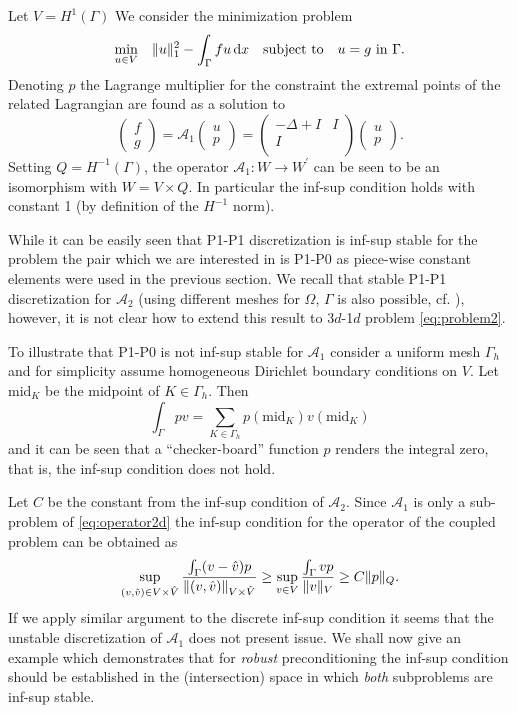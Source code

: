 Let $V=H^1{(\Gamma)}$ We consider the minimization problem
\[
\min_{u\in V}\quad\lVert{u}\rVert^2_1 - \int_{\Gamma}f u\,\mathrm{d}x\quad\mbox{subject to}\quad
u=g\mbox{ in }\Gamma.
\]
Denoting $p$ the Lagrange multiplier for the constraint the extremal points
of the related Lagrangian are found as a solution to
%
\begin{equation}\label{eq:A1}
\begin{pmatrix}f\\g\end{pmatrix}=
\mathcal{A}_1\begin{pmatrix}u\\p\end{pmatrix}=
%
\begin{pmatrix}
  -\Delta + I & I\\
  I           &  \\
\end{pmatrix}
\begin{pmatrix}u\\p\end{pmatrix}.
\end{equation}
%
Setting $Q=H^{-1}(\Gamma)$, the operator $\mathcal{A}_1:W\rightarrow W^{\prime}$
can be seen to be an isomorphism with $W=V\times Q$. In particular the inf-sup
condition holds with constant 1 (by definition of the $H^{-1}$ norm).

While it can be easily seen that P1-P1 discretization is inf-sup stable for
the problem the pair which we are interested in is P1-P0 as piece-wise constant
elements were used in the previous section. We recall that stable P1-P1 discretization
for $\mathcal{A}_2$ (using different meshes for $\Omega$, $\Gamma$ is also possible,
cf. \cite{burman2009interior}), however, it is not clear how to extend this result
to 3$d$-1$d$ problem \eqref{eq:problem2}.

To illustrate that P1-P0 is not inf-sup stable for $\mathcal{A}_1$ consider
a uniform mesh $\Gamma_h$ and for simplicity assume homogeneous Dirichlet
boundary conditions on $V$. Let $\text{mid}_{K}$ be the midpoint of $K\in\Gamma_h$.
Then 
\[
\int_{\Gamma} p v = \sum_{K\in{\Gamma}_h}p(\text{mid}_{K})v(\text{mid}_{K})
\]
and it can be seen that a ``checker-board'' function $p$ renders the integral
zero, that is, the inf-sup condition does not hold.

Let $C$ be the constant from the inf-sup condition of $\mathcal{A}_2$. 
Since $\mathcal{A}_1$ is only a sub-problem of \eqref{eq:operator2d} the
inf-sup condition for the operator of the coupled problem can be obtained as
\[
\sup_{(v,\hat{v})\in V\times \hat{V}}\frac{\int_{\Gamma}(v-\hat{v}) p}{\lVert{(v,\hat{v})}\rVert_{V\times \hat{V}}}
\geq
\sup_{v\in V}\frac{\int_{\Gamma}v p}{\lVert{v}\rVert_{V}}
\geq
C\lVert{p}\rVert_Q.
\]
If we apply similar argument to the discrete inf-sup condition it seems
that the unstable discretization of $\mathcal{A}_1$ does not present issue.
We shall now give an example which demonstrates that for \emph{robust} preconditioning
the inf-sup condition should be established in the (intersection) space in which \emph{both}
subproblems are inf-sup stable.

